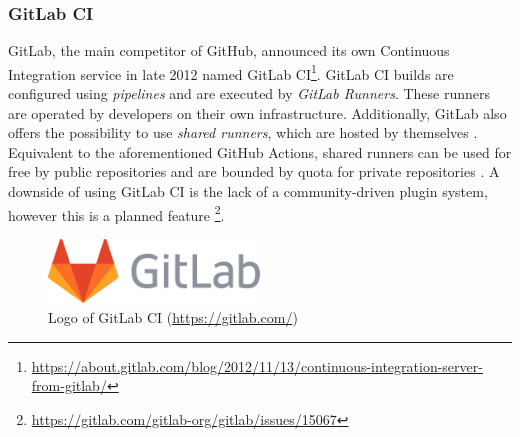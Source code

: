 
\subsubsection{GitLab CI}
GitLab, the main competitor of GitHub, announced its own Continuous Integration service in late 2012 named GitLab CI\footnote{\url{https://about.gitlab.com/blog/2012/11/13/continuous-integration-server-from-gitlab/}}. GitLab CI builds are configured using \emph{pipelines} and are executed by \emph{GitLab Runners}. These runners are operated by developers on their own infrastructure. Additionally, GitLab also offers the possibility to use \emph{shared runners}, which are hosted by themselves \cite{ciusinggitlab}. Equivalent to the aforementioned GitHub Actions, shared runners can be used for free by public repositories and are bounded by quota for private repositories \cite{gitlabdocs}. A downside of using GitLab CI is the lack of a community-driven plugin system, however this is a planned feature \footnote{\url{https://gitlab.com/gitlab-org/gitlab/issues/15067}}.

\begin{figure}[htbp!]
	\centering
	\includegraphics[width=0.5\textwidth]{assets/gitlab.pdf}
	\caption{Logo of GitLab CI (\url{https://gitlab.com/})}
	\label{fig:gitlab-ci}
\end{figure}
